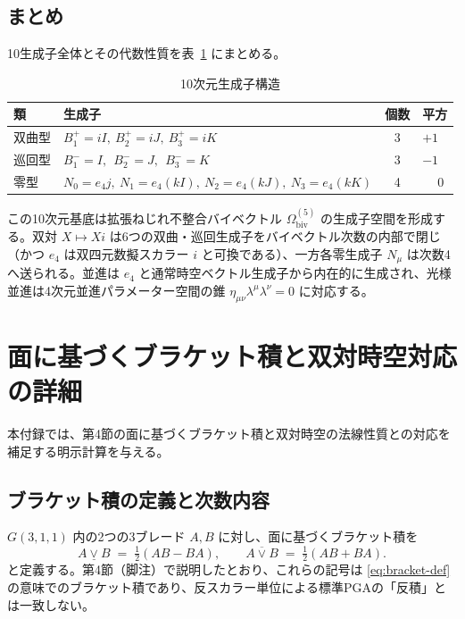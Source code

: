 \documentclass[dvipdfmx,11pt,a4paper]{article}
\theoremstyle{definition}
\theoremstyle{plain}
\theoremstyle{remark}
\begin{document}
\subsection{まとめ}

10生成子全体とその代数性質を表~\ref{tab:generators} にまとめる。

\begin{table}[htbp]
\centering
\caption{10次元生成子構造}
\label{tab:generators}
\begin{tabular}{llcl}
\hline
類           & 生成子                                                                & 個数 & 平方 \\
\hline
双曲型       & \(B_{1}^{+}=iI,\ B_{2}^{+}=iJ,\ B_{3}^{+}=iK\)                        & 3     & \(+1\) \\
巡回型       & \(B_{1}^{-}=I,\ \ B_{2}^{-}=J,\ \ B_{3}^{-}=K\)                       & 3     & \(-1\) \\
零型         & \(N_{0}=e_{4}j,\ N_{1}=e_{4}(kI),\ N_{2}=e_{4}(kJ),\ N_{3}=e_{4}(kK)\) & 4     & \(\phantom{+}0\) \\
\hline
\end{tabular}
\end{table}

この10次元基底は拡張ねじれ不整合バイベクトル $\Omega_{\text{biv}}^{(5)}$ の生成子空間を形成する。双対 $X\mapsto Xi$ は6つの双曲・巡回生成子をバイベクトル次数の内部で閉じ（かつ $e_{4}$ は双四元数擬スカラー $i$ と可換である）、一方各零生成子 $N_{\mu}$ は次数4へ送られる。並進は $e_{4}$ と通常時空ベクトル生成子から内在的に生成され、光様並進は4次元並進パラメーター空間の錐 $\eta_{\mu\nu}\lambda^{\mu}\lambda^{\nu}=0$ に対応する。

\section{面に基づくブラケット積と双対時空対応の詳細}

本付録では、第4節の面に基づくブラケット積と双対時空の法線性質との対応を補足する明示計算を与える。

\subsection{ブラケット積の定義と次数内容}

$G(3,1,1)$ 内の2つの3ブレード $A,B$ に対し、面に基づくブラケット積を
\[
A \mathbin{\underline{\vee}} B \;=\; \tfrac12 (AB - BA), \qquad
A \mathbin{\overline{\vee}} B \;=\; \tfrac12 (AB + BA).
\]
と定義する。第4節（脚注）で説明したとおり、これらの記号は \eqref{eq:bracket-def} の意味でのブラケット積であり、反スカラー単位による標準PGAの「反積」とは一致しない。
\end{document}
